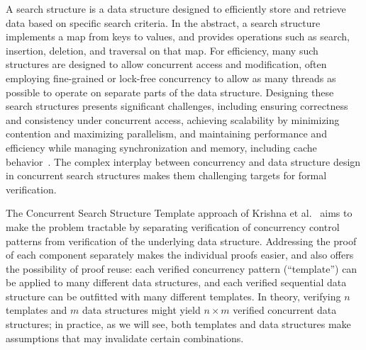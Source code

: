 \documentclass[a4paper,UKenglish,cleveref, autoref, thm-restate]{lipics-v2021}
\begin{document}
A search structure is a data structure designed to efficiently store and retrieve data based on specific search criteria. In the abstract, a search structure implements a map from keys to values, and provides operations such as search, insertion, deletion, and traversal on that map. For efficiency, many such structures are designed to allow concurrent access and modification, often employing fine-grained or lock-free concurrency to allow as many threads as possible to operate on separate parts of the data structure. Designing these search structures presents significant challenges, including ensuring correctness and consistency under concurrent access, achieving scalability by minimizing contention and maximizing parallelism, and maintaining performance and efficiency while managing synchronization and memory, including cache behavior~\cite{masstree}. The complex interplay between concurrency and data structure design in concurrent search structures makes them challenging targets for formal verification.

The Concurrent Search Structure Template approach of Krishna et al.~\cite{templates} aims to make the problem tractable by separating verification of concurrency control patterns from verification of the underlying data structure. Addressing the proof of each component separately makes the individual proofs easier, and also offers the possibility of proof reuse: each verified concurrency pattern (``template'') can be applied to many different data structures, and each verified sequential data structure can be outfitted with many different templates. In theory, verifying $n$ templates and $m$ data structures might yield $n \times m$ verified concurrent data structures; in practice, as we will see, both templates and data structures make assumptions that may invalidate certain combinations. %
\end{document}
